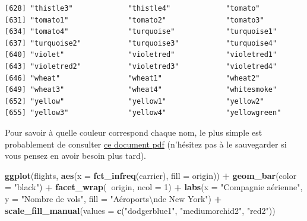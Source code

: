 \documentclass[a4paperpaper,]{article}
\newenvironment{Shaded}{\begin{snugshade}}{\end{snugshade}}
\newcommand{\KeywordTok}[1]{\textcolor[rgb]{0.13,0.29,0.53}{\textbf{#1}}}
\newcommand{\DataTypeTok}[1]{\textcolor[rgb]{0.13,0.29,0.53}{#1}}
\newcommand{\DecValTok}[1]{\textcolor[rgb]{0.00,0.00,0.81}{#1}}
\newcommand{\CharTok}[1]{\textcolor[rgb]{0.31,0.60,0.02}{#1}}
\newcommand{\StringTok}[1]{\textcolor[rgb]{0.31,0.60,0.02}{#1}}
\newcommand{\OperatorTok}[1]{\textcolor[rgb]{0.81,0.36,0.00}{\textbf{#1}}}
\newcommand{\NormalTok}[1]{#1}
\theoremstyle{definition}
\theoremstyle{definition}
\theoremstyle{definition}
\theoremstyle{remark}
\begin{document}
\begin{verbatim}
[628] "thistle3"             "thistle4"             "tomato"              
[631] "tomato1"              "tomato2"              "tomato3"             
[634] "tomato4"              "turquoise"            "turquoise1"          
[637] "turquoise2"           "turquoise3"           "turquoise4"          
[640] "violet"               "violetred"            "violetred1"          
[643] "violetred2"           "violetred3"           "violetred4"          
[646] "wheat"                "wheat1"               "wheat2"              
[649] "wheat3"               "wheat4"               "whitesmoke"          
[652] "yellow"               "yellow1"              "yellow2"             
[655] "yellow3"              "yellow4"              "yellowgreen"         
\end{verbatim}

Pour savoir à quelle couleur correspond chaque nom, le plus simple est
probablement de consulter
\href{http://www.stat.columbia.edu/~tzheng/files/Rcolor.pdf}{ce document
pdf} (n'hésitez pas à le sauvegarder si vous pensez en avoir besoin plus
tard).

\begin{Shaded}
\begin{Highlighting}[]
\KeywordTok{ggplot}\NormalTok{(flights, }\KeywordTok{aes}\NormalTok{(}\DataTypeTok{x =} \KeywordTok{fct_infreq}\NormalTok{(carrier), }\DataTypeTok{fill =}\NormalTok{ origin)) }\OperatorTok{+}
\StringTok{  }\KeywordTok{geom_bar}\NormalTok{(}\DataTypeTok{color =} \StringTok{"black"}\NormalTok{) }\OperatorTok{+}
\StringTok{  }\KeywordTok{facet_wrap}\NormalTok{(}\OperatorTok{~}\NormalTok{origin, }\DataTypeTok{ncol =} \DecValTok{1}\NormalTok{) }\OperatorTok{+}
\StringTok{  }\KeywordTok{labs}\NormalTok{(}\DataTypeTok{x =} \StringTok{"Compagnie aérienne"}\NormalTok{,}
       \DataTypeTok{y =} \StringTok{"Nombre de vols"}\NormalTok{,}
       \DataTypeTok{fill =} \StringTok{"Aéroports}\CharTok{\textbackslash{}n}\StringTok{de New York"}\NormalTok{) }\OperatorTok{+}
\StringTok{  }\KeywordTok{scale_fill_manual}\NormalTok{(}\DataTypeTok{values =} \KeywordTok{c}\NormalTok{(}\StringTok{"dodgerblue1"}\NormalTok{, }\StringTok{"mediumorchid2"}\NormalTok{, }\StringTok{"red2"}\NormalTok{))}
\end{Highlighting}
\end{Shaded}
\end{document}
